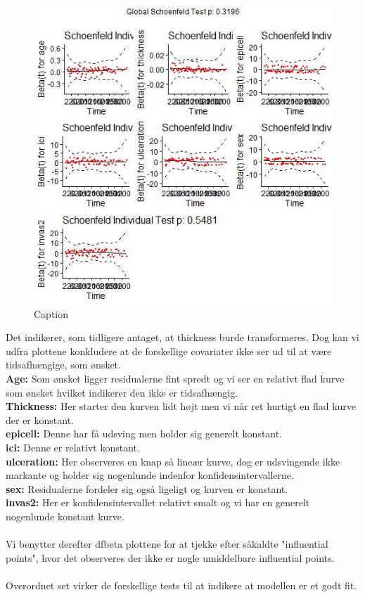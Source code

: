 \begin{figure}[h]
    \centering
    \includegraphics[width=0.7\linewidth]{Basses_kode/Billeder_duration/Schoenfeld_Residuals.jpeg}
    \caption{Caption}
    \label{fig:enter-label}
\end{figure}
\newpage
Det indikerer, som tidligere antaget, at thickness burde transformeres. Dog kan vi udfra plottene konkludere at de forskellige covariater ikke ser ud til at være tidsafhængige, som ønsket.\\
\textbf{Age:} Som ønsket ligger residualerne fint spredt og vi ser en relativt flad kurve som ønsket hvilket indikerer den ikke er tidsafhængig.\\
\textbf{Thickness:} Her starter den kurven lidt højt men vi når ret hurtigt en flad kurve der er konstant.\\
\textbf{epicell:} Denne har få udsving men holder sig generelt konstant.\\
\textbf{ici:} Denne er relativt konstant.\\
\textbf{ulceration:} Her observeres en knap så lineær kurve, dog er udsvingende ikke markante og holder sig nogenlunde indenfor konfidensintervallerne.\\
\textbf{sex:} Residualerne fordeler sig også ligeligt og kurven er konstant.\\
\textbf{invas2:} Her er konfidensintervallet relativt smalt og vi har en generelt nogenlunde konstant kurve. \\\\

\noindent Vi benytter derefter dfbeta plottene for at tjekke efter såkaldte "influential points", hvor det observeres der ikke er nogle umiddelbare influential points.\\\\
\noindent Overordnet set virker de forskellige tests til at indikere at modellen er et godt fit.



